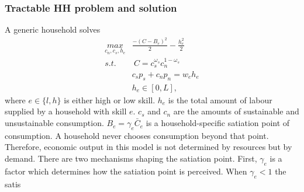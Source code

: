 \subsubsection{Tractable HH problem and solution}
A generic household solves
\begin{align*}
\underset{c_n, c_s, h_e}{max}& \frac{-(C-B_e)^2}{2}- \frac{h_e^2}{2}\\
s.t.& \ C= c_s^{\omega_s} c_n^{1-\omega_s}\\
& c_sp_s+c_np_n=w_e h_e\\ %
& h_e\in[0,L],
\end{align*}
where $e\in\{l,h\}$ is either high or low skill. $h_e$  is the total amount of labour supplied by a household with skill $e$. $c_s$ and $c_n$ are the amounts of sustainable and unsustainable consumption.  $B_e = \gamma_e\bar{C}_e$ is a household-specific satiation point of consumption. A household never chooses consumption beyond that point. Therefore, economic output in this model is not determined by resources but by demand. 
There are two mechanisms shaping the satiation point. First, $\gamma_e$ is a factor which determines how the satiation point is perceived. When $\gamma_e<1$ the satis 
\begin{comment}
(\textit{Note: Could allow high-skill workers to choose where to work BUT then same wage rate!})

content...
\end{comment}


\begin{comment}
\paragraph{Alternative specification: rich can choose where to work } \ar should ensure that the wage of the rich is higher than the wage paid for low-skill workers; otherwise there would be no high-skill labour supply.

The problem of a high-skill household then reads
\begin{align*}
\underset{c_n, c_s, h_e}{max}& \frac{-(C-B)^2}{2}- \frac{h_e^2}{2}\\
s.t.& \ C= c_s^{\omega_s} c_n^{1-\omega_s}\\
& c_sp_s+c_np_n=w_h n_h+w_l n_l\\
& n_h+n_l=h_e\\
& n_{-e}=0 \ if\ e=l\\
& h_e\in\{0,L\}.
\end{align*}

content...
\end{comment}

